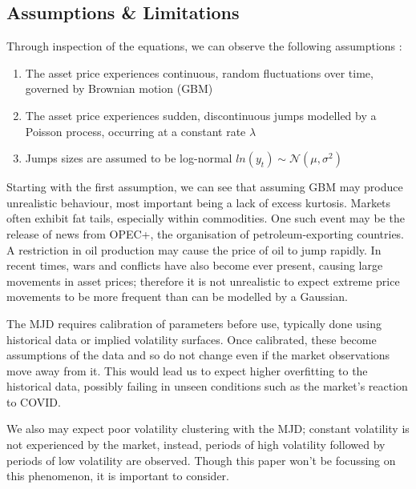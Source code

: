 \documentclass[12pt]{article}
\newcommand{\newp}
    {
    \vskip 0.5cm 
  }
\numberwithin{equation}{section}
\begin{document}
\subsection{Assumptions \& Limitations}
Through inspection of the equations, we can observe the following assumptions \autocite{viewonmerton}:
\begin{enumerate}
\item The asset price experiences continuous, random fluctuations over time,
  governed by Brownian motion (GBM)
\item The asset price experiences sudden, discontinuous jumps modelled by a 
  Poisson process, occurring at a constant rate $\lambda$
\item Jumps sizes are assumed to be log-normal $ln(y_t) \sim \mathcal{N}(\mu,\sigma^2)$
\end{enumerate}
Starting with the first assumption, we can see that assuming GBM may produce
unrealistic behaviour, most important being a lack of excess kurtosis.
Markets 
often exhibit fat tails, especially within commodities. One such event may 
be the release of news from OPEC+, the organisation of petroleum-exporting 
countries. A restriction in oil production may cause the price of oil to jump 
rapidly. In recent times, wars and conflicts have also become 
ever present, causing large movements in asset prices; therefore it is not 
unrealistic to
expect extreme price movements to be more frequent than can be modelled 
by a Gaussian.
\newp
The MJD requires calibration of parameters before use, typically done using historical 
data or implied volatility surfaces. Once calibrated, these become assumptions of 
the data and so do not change even if the market observations move away from it. 
This would lead us to expect higher overfitting to the historical data, possibly 
failing in unseen conditions such as the market's reaction to COVID. 
\newp 
We also may expect poor volatility clustering with the MJD; constant volatility 
is not experienced by the market, instead, periods of high volatility followed 
by periods of low volatility are observed. Though this paper won't be focussing 
on this phenomenon, it is important to consider.
\end{document}
